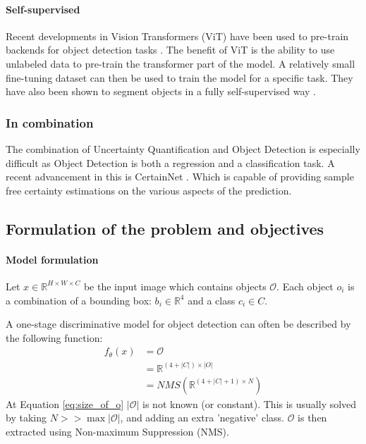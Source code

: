 \paragraph*{Self-supervised}
Recent developments in Vision Transformers (ViT) \cite{dosovitskiy2021image} have been used to pre-train backends for object detection tasks \cite{carion2020endtoend}. The benefit of ViT is the ability to use unlabeled data to pre-train the transformer part of the model. A relatively small fine-tuning dataset can then be used to train the model for a specific task. They have also been shown to segment objects in a fully self-supervised way \cite{caron2021emerging}.

\subsubsection{In combination}\label{sec:broadliterature:combination}
The combination of Uncertainty Quantification and Object Detection is especially difficult as Object Detection is both a regression and a classification task. A recent advancement in this is CertainNet \cite{Gasperini_2022}. Which is capable of providing sample free certainty estimations on the various aspects of the prediction.

\subsection{Formulation of the problem and objectives}
\paragraph*{Model formulation}
Let $x \in \mathbb{R}^{H\times W\times C}$ be the input image which contains objects $\mathcal{O}$. Each object $o_i$ is a combination of a bounding box: $b_i \in \mathbb{R}^{4}$ and a class $c_i \in C$.

A one-stage discriminative model for object detection can often be described by the following function:
\begin{align}
    f_{\theta}(x) & = \mathcal{O}                                             \\
                  & = \mathbb{R}^{(4 + |C|) \times |O|} \label{eq:size_of_o}  \\
                  & = NMS(\mathbb{R}^{(4 + |C| + 1) \times N}) \label{eq:nms}
\end{align}
At Equation \ref{eq:size_of_o} $|\mathcal{O}|$ is not known (or constant). This is usually solved by taking $N >> \max{|\mathcal{O}|}$\cite{bochkovskiy2020yolov4, wang2022yolov7, liu2016ssd}, and adding an extra 'negative' class. $\mathcal{O}$ is then extracted using Non-maximum Suppression (NMS).

